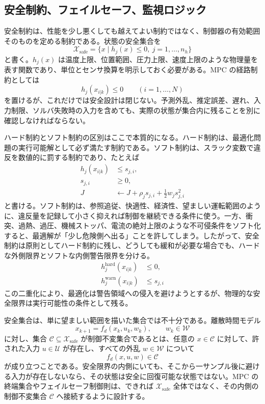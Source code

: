 \subsection{安全制約、フェイルセーフ、監視ロジック}

安全制約は、性能を少し悪くしても越えてよい制約ではなく、制御器の有効範囲そのものを定める制約である。状態の安全集合を
\begin{equation}
  \mathcal{X}_{\mathrm{safe}}
  =
  \{x\mid h_j(x)\le0,\ j=1,\ldots,n_h\}
\end{equation}
と書く。$h_j(x)$ は温度上限、位置範囲、圧力上限、速度上限のような物理量を表す関数であり、単位とセンサ換算を明示しておく必要がある。MPC の経路制約としては
\begin{equation}
  h_j(x_{i|k})\le0
  \qquad (i=1,\ldots,N)
\end{equation}
を置けるが、これだけでは安全設計は閉じない。予測外乱、推定誤差、遅れ、入力制限、ソルバ失敗時の入力を含めても、実際の状態が集合内に残ることを別に確認しなければならない。

ハード制約とソフト制約の区別はここで本質的になる。ハード制約は、最適化問題の実行可能解として必ず満たす制約である。ソフト制約は、スラック変数で違反を数値的に罰する制約であり、たとえば
\begin{align}
  h_j(x_{i|k})&\le s_{j,i},\\
  s_{j,i}&\ge0,\\
  J&\leftarrow J+\rho_j s_{j,i}+\frac{1}{2}w_j s_{j,i}^{2}
\end{align}
と書ける。ソフト制約は、参照追従、快適性、経済性、望ましい運転範囲のように、違反量を記録して小さく抑えれば制御を継続できる条件に使う。一方、衝突、過熱、過圧、機械ストッパ、電流の絶対上限のような不可侵条件をソフト化すると、最適解が「少し危険側へ出る」ことを許してしまう。したがって、安全制約は原則としてハード制約に残し、どうしても緩和が必要な場合でも、ハードな外側限界とソフトな内側警告限界を分ける。
\begin{align}
  h_j^{\mathrm{hard}}(x_{i|k})&\le0,\\
  h_j^{\mathrm{warn}}(x_{i|k})&\le s_{j,i}
\end{align}
この二重化により、最適化は警告領域への侵入を避けようとするが、物理的な安全限界は実行可能性の条件として残る。

安全集合は、単に望ましい範囲を描いた集合では不十分である。離散時間モデル
\begin{equation}
  x_{k+1}=f_d(x_k,u_k,w_k),
  \qquad
  w_k\in\mathcal{W}
\end{equation}
に対し、集合 $\mathcal{C}\subseteq\mathcal{X}_{\mathrm{safe}}$ が制御不変集合であるとは、任意の $x\in\mathcal{C}$ に対して、許された入力 $u\in\mathcal{U}$ が存在し、すべての外乱 $w\in\mathcal{W}$ について
\begin{equation}
  f_d(x,u,w)\in\mathcal{C}
\end{equation}
が成り立つことである。安全限界の内側にいても、そこから一サンプル後に避ける入力が存在しないなら、その状態は安全に回復可能な状態ではない。MPC の終端集合やフェイルセーフ制御則は、できれば $\mathcal{X}_{\mathrm{safe}}$ 全体ではなく、その内側の制御不変集合 $\mathcal{C}$ へ接続するように設計する。

